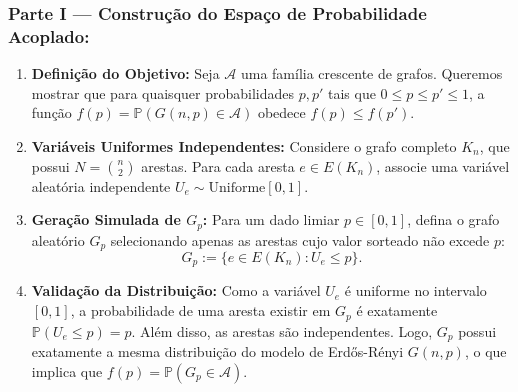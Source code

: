\documentclass[11pt, a4paper]{article}
\begin{document}
\subsubsection{Parte I --- Construção do Espaço de Probabilidade Acoplado:}
\begin{enumerate}
    \item \textbf{Definição do Objetivo:} Seja $\mathcal{A}$ uma família crescente de grafos. Queremos mostrar que para quaisquer probabilidades $p, p'$ tais que $0 \le p \le p' \le 1$, a função $f(p) = \mathbb{P}(G(n,p) \in \mathcal{A})$ obedece $f(p) \le f(p')$.
    \item \textbf{Variáveis Uniformes Independentes:} Considere o grafo completo $K_n$, que possui $N = \binom{n}{2}$ arestas. Para cada aresta $e \in E(K_n)$, associe uma variável aleatória independente $U_e \sim \text{Uniforme}[0, 1]$.
    \item \textbf{Geração Simulada de $G_p$:} Para um dado limiar $p \in [0,1]$, defina o grafo aleatório $G_p$ selecionando apenas as arestas cujo valor sorteado não excede $p$: 
    \[ G_p := \{e \in E(K_n) : U_e \le p\}. \]
    \item \textbf{Validação da Distribuição:} Como a variável $U_e$ é uniforme no intervalo $[0,1]$, a probabilidade de uma aresta existir em $G_p$ é exatamente $\mathbb{P}(U_e \le p) = p$. Além disso, as arestas são independentes. Logo, $G_p$ possui exatamente a mesma distribuição do modelo de Erdős-Rényi $G(n,p)$, o que implica que $f(p) = \mathbb{P}(G_p \in \mathcal{A})$.
\end{enumerate}
\end{document}
